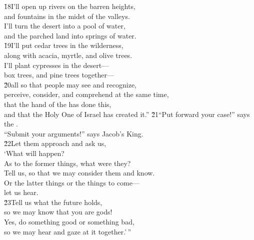\begin{poetry}
\poeml \v{18}I'll open up rivers on the barren heights, \\
\poemll    and fountains in the midst of the valleys. \\
\poeml I'll turn the desert into a pool of water, \\
\poemll    and the parched land into springs of water. \\
\poeml \v{19}I'll put cedar trees in the wilderness, \\
\poemll    along with acacia, myrtle, and olive trees. \\
\poeml I'll plant cypresses in the desert--- \\
\poemll    box trees, and pine trees together--- \\
\poeml \v{20}all so that people may see and recognize, \\
\poemll    perceive, consider, and comprehend at the same time, \\
\poeml that the hand of the  has done this, \\
\poemll    and that the Holy One of Israel has created it.''
\poeml \v{21}``Put forward your case!'' says the . \\
\poemll    ``Submit your arguments!'' says Jacob's King. \\
\poeml \v{22}Let them approach and ask us, \\
\poemll    `What will happen? \\
\poeml As to the former things, what were they? \\
\poemll    Tell us, so that we may consider them and know. \\
\poeml Or the latter things or the things to come--- \\
\poemlll       let us hear. \\
\poeml \v{23}Tell us what the future holds, \\
\poemll    so we may know that you are gods! \\
\poeml Yes, do something good or something bad, \\
\poemll    so we may hear and gaze at it together.'\,'' \\

\end{poetry}
